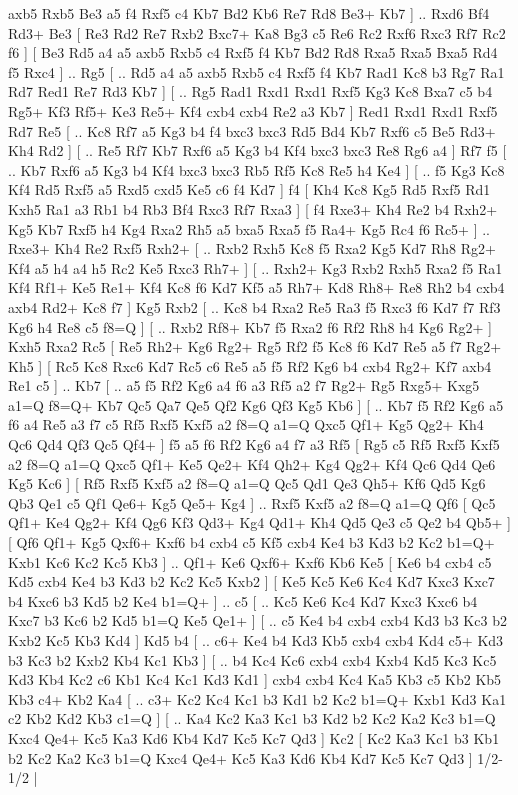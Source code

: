 axb5 Rxb5  Be3 a5  f4 Rxf5  c4 Kb7  Bd2 Kb6  Re7 Rd8  Be3+ Kb7   ] .. Rxd6    Bf4   Rd3+    Be3 [  Re3 Rd2  Re7 Rxb2  Bxc7+ Ka8  Bg3 c5  Re6 Rc2  Rxf6 Rxc3  Rf7 Rc2  f6   ]  [  Be3 Rd5  a4 a5  axb5 Rxb5  c4 Rxf5  f4 Kb7  Bd2 Rd8  Rxa5 Rxa5  Bxa5 Rd4  f5 Rxc4   ] .. Rg5 [ .. Rd5  a4 a5  axb5 Rxb5  c4 Rxf5  f4 Kb7  Rad1 Kc8  b3 Rg7  Ra1 Rd7  Red1 Re7  Rd3 Kb7   ]  [ .. Rg5  Rad1 Rxd1  Rxd1 Rxf5  Kg3 Kc8  Bxa7 c5  b4 Rg5+  Kf3 Rf5+  Ke3 Re5+  Kf4 cxb4  cxb4 Re2  a3 Kb7   ]  Red1   Rxd1    Rxd1   Rxf5    Rd7   Re5 [ .. Kc8  Rf7 a5  Kg3 b4  f4 bxc3  bxc3 Rd5  Bd4 Kb7  Rxf6 c5  Be5 Rd3+  Kh4 Rd2   ]  [ .. Re5  Rf7 Kb7  Rxf6 a5  Kg3 b4  Kf4 bxc3  bxc3 Re8  Rg6 a4   ]  Rf7   f5 [ .. Kb7  Rxf6 a5  Kg3 b4  Kf4 bxc3  bxc3 Rb5  Rf5 Kc8  Re5 h4  Ke4   ]  [ .. f5  Kg3 Kc8  Kf4 Rd5  Rxf5 a5  Rxd5 cxd5  Ke5 c6  f4 Kd7   ]  f4 [  Kh4 Kc8  Kg5 Rd5  Rxf5 Rd1  Kxh5 Ra1  a3 Rb1  b4 Rb3  Bf4 Rxc3  Rf7 Rxa3   ]  [  f4 Rxe3+  Kh4 Re2  b4 Rxh2+  Kg5 Kb7  Rxf5 h4  Kg4 Rxa2  Rh5 a5  bxa5 Rxa5  f5 Ra4+  Kg5 Rc4  f6 Rc5+   ] .. Rxe3+    Kh4   Re2    Rxf5   Rxh2+ [ .. Rxb2  Rxh5 Kc8  f5 Rxa2  Kg5 Kd7  Rh8 Rg2+  Kf4 a5  h4 a4  h5 Rc2  Ke5 Rxc3  Rh7+   ]  [ .. Rxh2+  Kg3 Rxb2  Rxh5 Rxa2  f5 Ra1  Kf4 Rf1+  Ke5 Re1+  Kf4 Kc8  f6 Kd7  Kf5 a5  Rh7+ Kd8  Rh8+ Re8  Rh2 b4  cxb4 axb4  Rd2+ Kc8  f7   ]  Kg5   Rxb2 [ .. Kc8  b4 Rxa2  Re5 Ra3  f5 Rxc3  f6 Kd7  f7 Rf3  Kg6 h4  Re8 c5  f8=Q   ]  [ .. Rxb2  Rf8+ Kb7  f5 Rxa2  f6 Rf2  Rh8 h4  Kg6 Rg2+   ]  Kxh5   Rxa2    Rc5 [  Re5 Rh2+  Kg6 Rg2+  Rg5 Rf2  f5 Kc8  f6 Kd7  Re5 a5  f7 Rg2+  Kh5   ]  [  Rc5 Kc8  Rxc6 Kd7  Rc5 c6  Re5 a5  f5 Rf2  Kg6 b4  cxb4 Rg2+  Kf7 axb4  Re1 c5   ] .. Kb7 [ .. a5  f5 Rf2  Kg6 a4  f6 a3  Rf5 a2  f7 Rg2+  Rg5 Rxg5+  Kxg5 a1=Q  f8=Q+ Kb7  Qc5 Qa7  Qe5 Qf2  Kg6 Qf3  Kg5 Kb6   ]  [ .. Kb7  f5 Rf2  Kg6 a5  f6 a4  Re5 a3  f7 c5  Rf5 Rxf5  Kxf5 a2  f8=Q a1=Q  Qxc5 Qf1+  Kg5 Qg2+  Kh4 Qc6  Qd4 Qf3  Qc5 Qf4+   ]  f5   a5    f6   Rf2    Kg6   a4    f7   a3    Rf5 [  Rg5 c5  Rf5 Rxf5  Kxf5 a2  f8=Q a1=Q  Qxc5 Qf1+  Ke5 Qe2+  Kf4 Qh2+  Kg4 Qg2+  Kf4 Qc6  Qd4 Qe6  Kg5 Kc6   ]  [  Rf5 Rxf5  Kxf5 a2  f8=Q a1=Q  Qc5 Qd1  Qe3 Qh5+  Kf6 Qd5  Kg6 Qb3  Qe1 c5  Qf1 Qe6+  Kg5 Qe5+  Kg4   ] .. Rxf5    Kxf5   a2    f8=Q   a1=Q    Qf6 [  Qc5 Qf1+  Ke4 Qg2+  Kf4 Qg6  Kf3 Qd3+  Kg4 Qd1+  Kh4 Qd5  Qe3 c5  Qe2 b4  Qb5+   ]  [  Qf6 Qf1+  Kg5 Qxf6+  Kxf6 b4  cxb4 c5  Kf5 cxb4  Ke4 b3  Kd3 b2  Kc2 b1=Q+  Kxb1 Kc6  Kc2 Kc5  Kb3   ] .. Qf1+    Ke6   Qxf6+    Kxf6   Kb6    Ke5 [  Ke6 b4  cxb4 c5  Kd5 cxb4  Ke4 b3  Kd3 b2  Kc2 Kc5  Kxb2   ]  [  Ke5 Kc5  Ke6 Kc4  Kd7 Kxc3  Kxc7 b4  Kxc6 b3  Kd5 b2  Ke4 b1=Q+   ] .. c5 [ .. Kc5  Ke6 Kc4  Kd7 Kxc3  Kxc6 b4  Kxc7 b3  Kc6 b2  Kd5 b1=Q  Ke5 Qe1+   ]  [ .. c5  Ke4 b4  cxb4 cxb4  Kd3 b3  Kc3 b2  Kxb2 Kc5  Kb3 Kd4   ]  Kd5   b4 [ .. c6+  Ke4 b4  Kd3 Kb5  cxb4 cxb4  Kd4 c5+  Kd3 b3  Kc3 b2  Kxb2 Kb4  Kc1 Kb3   ]  [ .. b4  Kc4 Kc6  cxb4 cxb4  Kxb4 Kd5  Kc3 Kc5  Kd3 Kb4  Kc2 c6  Kb1 Kc4  Kc1 Kd3  Kd1   ]  cxb4   cxb4    Kc4   Ka5    Kb3   c5    Kb2   Kb5    Kb3   c4+    Kb2   Ka4 [ .. c3+  Kc2 Kc4  Kc1 b3  Kd1 b2  Kc2 b1=Q+  Kxb1 Kd3  Ka1 c2  Kb2 Kd2  Kb3 c1=Q   ]  [ .. Ka4  Kc2 Ka3  Kc1 b3  Kd2 b2  Kc2 Ka2  Kc3 b1=Q  Kxc4 Qe4+  Kc5 Ka3  Kd6 Kb4  Kd7 Kc5  Kc7 Qd3   ]  Kc2    [  Kc2 Ka3  Kc1 b3  Kb1 b2  Kc2 Ka2  Kc3 b1=Q  Kxc4 Qe4+  Kc5 Ka3  Kd6 Kb4  Kd7 Kc5  Kc7 Qd3   ] 1/2-1/2  |
